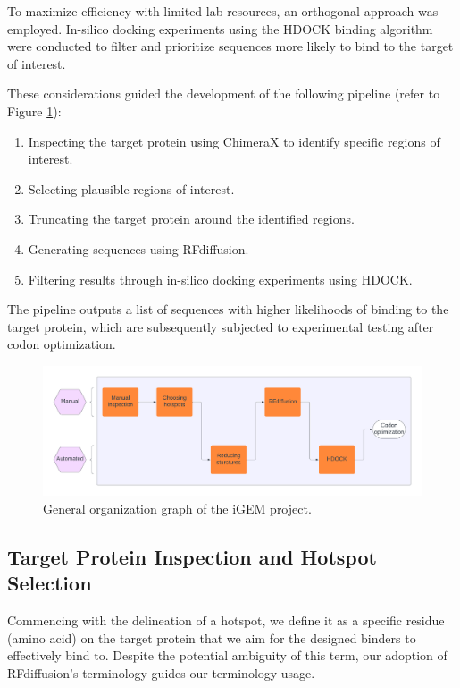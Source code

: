 \documentclass[11pt,a4paper]{article}
\begin{document}
To maximize efficiency with limited lab resources, an 
orthogonal approach was employed. In-silico docking experiments using 
the HDOCK binding algorithm were conducted to filter and prioritize 
sequences more likely to bind to the target of interest.

These considerations guided the development of the following pipeline 
(refer to Figure \ref{fig:organization_graph}):

\begin{enumerate}
    \item Inspecting the target protein using ChimeraX to identify 
    specific regions of interest.
    \item Selecting plausible regions of interest.
    \item Truncating the target protein around the identified regions.
    \item Generating sequences using RFdiffusion.
    \item Filtering results through in-silico docking experiments using 
    HDOCK.
\end{enumerate}

The pipeline outputs a list of sequences with higher likelihoods of binding to the target protein, which are subsequently subjected to experimental testing after codon optimization.

\begin{figure}[ht]
    \centering
    \includegraphics[width=\textwidth]{Supplementary Data/Figures/iGEM_project_general_organization_graph.pdf}
    \caption{General organization graph of the iGEM project.}
    \label{fig:organization_graph}
\end{figure}

\subsection{Target Protein Inspection and Hotspot Selection}

Commencing with the delineation of a hotspot, we define it as a specific residue (amino acid) on the target protein that we aim for the designed binders to effectively bind to. Despite the potential ambiguity of this term, our adoption of RFdiffusion's terminology guides our terminology usage.
\end{document}
